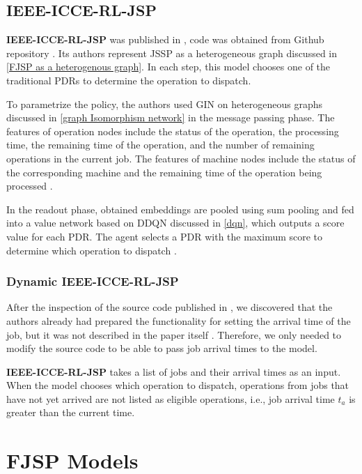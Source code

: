 \subsection{IEEE-ICCE-RL-JSP} \label{model_iee_icce_rl_jsp}

\textbf{IEEE-ICCE-RL-JSP} was published in \cite{10226873}, code was obtained from Github repository \cite{github_ieee_icce_rl_jsp}. Its authors represent JSSP as a heterogeneous graph discussed in \ref{FJSP as a heterogenous graph}. In each step, this model chooses one of the traditional PDRs to determine the operation to dispatch.
\par
To parametrize the policy, the authors used GIN on heterogeneous graphs discussed in \ref{graph Isomorphism network} in the message passing phase. The features of operation nodes include the status of the operation, the processing time, the remaining time of the operation, and the number of remaining operations in the current job. The features of machine nodes include the status of the corresponding machine and the remaining time of the operation being processed \cite{10226873}.
\par
In the readout phase, obtained embeddings are pooled using sum pooling and fed into a value network based on DDQN discussed in \ref{dqn}, which outputs a score value for each PDR. The agent selects a PDR with the maximum score to determine which operation to dispatch \cite{10226873}.

\subsubsection{Dynamic IEEE-ICCE-RL-JSP}

After the inspection of the source code \cite{github_ieee_icce_rl_jsp} published in \cite{10226873}, we discovered that the authors already had prepared the functionality for setting the arrival time of the job, but it was not described in the paper itself \cite{10226873}. Therefore, we only needed to modify the source code to be able to pass job arrival times to the model. 
\par
\textbf{IEEE-ICCE-RL-JSP} takes a list of jobs and their arrival times as an input. When the model chooses which operation to dispatch, operations from jobs that have not yet arrived are not listed as eligible operations, i.e., job arrival time $t_a$ is greater than the current time.

\section{FJSP Models}

